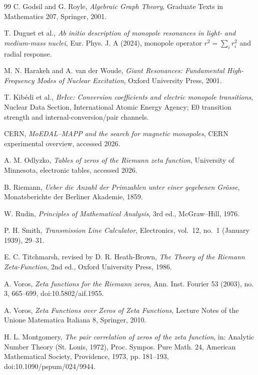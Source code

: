 \documentclass[11pt]{amsart}
\theoremstyle{definition}
\theoremstyle{remark}
\begin{document}
\begin{thebibliography}{99}
C. Godsil and G. Royle, \emph{Algebraic Graph Theory}, Graduate Texts in Mathematics 207, Springer, 2001.

T. Duguet et al., \emph{Ab initio description of monopole resonances in light- and medium-mass nuclei}, Eur. Phys. J. A (2024), monopole operator $r^2=\sum_i r_i^2$ and radial response.

M. N. Harakeh and A. van der Woude, \emph{Giant Resonances: Fundamental High-Frequency Modes of Nuclear Excitation}, Oxford University Press, 2001.

T. Kib\'edi et al., \emph{BrIcc: Conversion coefficients and electric monopole transitions}, Nuclear Data Section, International Atomic Energy Agency; E0 transition strength and internal-conversion/pair channels.

CERN, \emph{MoEDAL--MAPP and the search for magnetic monopoles}, CERN experimental overview, accessed 2026.

A. M. Odlyzko, \emph{Tables of zeros of the Riemann zeta function}, University of Minnesota, electronic tables, accessed 2026.

B. Riemann, \emph{Ueber die Anzahl der Primzahlen unter einer gegebenen Grösse}, Monatsberichte der Berliner Akademie, 1859.

W. Rudin, \emph{Principles of Mathematical Analysis}, 3rd ed., McGraw--Hill, 1976.

P. H. Smith, \emph{Transmission Line Calculator}, Electronics, vol.~12, no.~1
(January 1939), 29--31.

E. C. Titchmarsh, revised by D. R. Heath-Brown, \emph{The Theory of the Riemann Zeta-Function}, 2nd ed., Oxford University Press, 1986.

A. Voros, \emph{Zeta functions for the Riemann zeros}, Ann. Inst. Fourier 53 (2003), no. 3, 665--699, doi:10.5802/aif.1955.

A. Voros, \emph{Zeta Functions over Zeros of Zeta Functions}, Lecture Notes of the Unione Matematica Italiana 8, Springer, 2010.

H. L. Montgomery, \emph{The pair correlation of zeros of the zeta function}, in: Analytic Number Theory (St. Louis, 1972), Proc. Sympos. Pure Math. 24, American Mathematical Society, Providence, 1973, pp. 181--193, doi:10.1090/pspum/024/9944.


\end{thebibliography}
\end{document}
